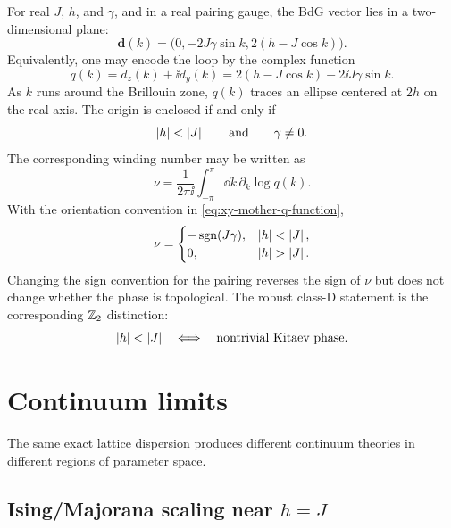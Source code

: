 For real $J$, $h$, and $\gamma$, and in a real pairing gauge, the BdG vector lies
in a two-dimensional plane:
\begin{equation}
\label{eq:xy-mother-bdg-plane-vector}
    \bm d(k)=
    \bigl(0,-2J\gamma\sin k,2(h-J\cos k)\bigr).
\end{equation}
Equivalently, one may encode the loop by the complex function
\begin{equation}
\label{eq:xy-mother-q-function}
    q(k)=d_z(k)+\ii d_y(k)
    =
    2(h-J\cos k)-2\ii J\gamma\sin k.
\end{equation}
As $k$ runs around the Brillouin zone, $q(k)$ traces an ellipse centered at
$2h$ on the real axis.  The origin is enclosed if and only if
\begin{equation}
    \left|h\right|<\left|J\right|
    \qquad
    \text{and}
    \qquad
    \gamma\neq0.
\end{equation}
The corresponding winding number may be written as
\begin{equation}
\label{eq:xy-mother-winding-number}
    \nu
    =
    \frac{1}{2\pi\ii}
    \int_{-\pi}^{\pi}\dd k\,\partial_k\log q(k).
\end{equation}
With the orientation convention in \cref{eq:xy-mother-q-function},
\begin{equation}
\label{eq:xy-mother-winding-result}
    \nu
    =
    \begin{cases}
        -\operatorname{sgn}(J\gamma), & \abs{h}<\abs{J},\\
        0, & \abs{h}>\abs{J}.
    \end{cases}
\end{equation}
Changing the sign convention for the pairing reverses the sign of $\nu$ but does
not change whether the phase is topological.  The robust class-D statement is
the corresponding $\mathbb{Z}_2$ distinction:
\begin{equation}
\label{eq:xy-mother-z2-topological-condition}
    \left|h\right|<\left|J\right|
    \quad\Longleftrightarrow\quad
    \text{nontrivial Kitaev phase}.
\end{equation}

\section{Continuum limits}
\label{sec:xy-continuum-limits}

The same exact lattice dispersion produces different continuum theories in
different regions of parameter space.

\subsection*{Ising/Majorana scaling near $h=J$}


